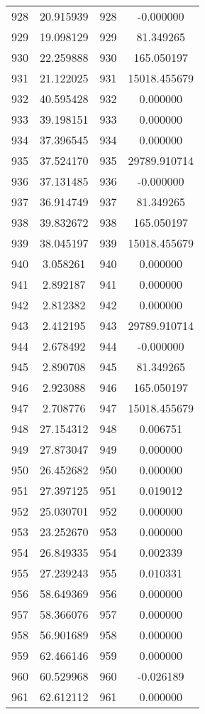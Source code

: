 \documentclass[12pt]{article}
\begin{document}
\begin{longtable}{@{}cccc@{}}
928 & 20.915939 & 928 & -0.000000 \\
929 & 19.098129 & 929 & 81.349265 \\
930 & 22.259888 & 930 & 165.050197 \\
931 & 21.122025 & 931 & 15018.455679 \\
932 & 40.595428 & 932 & 0.000000 \\
933 & 39.198151 & 933 & 0.000000 \\
934 & 37.396545 & 934 & 0.000000 \\
935 & 37.524170 & 935 & 29789.910714 \\
936 & 37.131485 & 936 & -0.000000 \\
937 & 36.914749 & 937 & 81.349265 \\
938 & 39.832672 & 938 & 165.050197 \\
939 & 38.045197 & 939 & 15018.455679 \\
940 & 3.058261 & 940 & 0.000000 \\
941 & 2.892187 & 941 & 0.000000 \\
942 & 2.812382 & 942 & 0.000000 \\
943 & 2.412195 & 943 & 29789.910714 \\
944 & 2.678492 & 944 & -0.000000 \\
945 & 2.890708 & 945 & 81.349265 \\
946 & 2.923088 & 946 & 165.050197 \\
947 & 2.708776 & 947 & 15018.455679 \\
948 & 27.154312 & 948 & 0.006751 \\
949 & 27.873047 & 949 & 0.000000 \\
950 & 26.452682 & 950 & 0.000000 \\
951 & 27.397125 & 951 & 0.019012 \\
952 & 25.030701 & 952 & 0.000000 \\
953 & 23.252670 & 953 & 0.000000 \\
954 & 26.849335 & 954 & 0.002339 \\
955 & 27.239243 & 955 & 0.010331 \\
956 & 58.649369 & 956 & 0.000000 \\
957 & 58.366076 & 957 & 0.000000 \\
958 & 56.901689 & 958 & 0.000000 \\
959 & 62.466146 & 959 & 0.000000 \\
960 & 60.529968 & 960 & -0.026189 \\
961 & 62.612112 & 961 & 0.000000 \\

\end{longtable}
\end{document}
